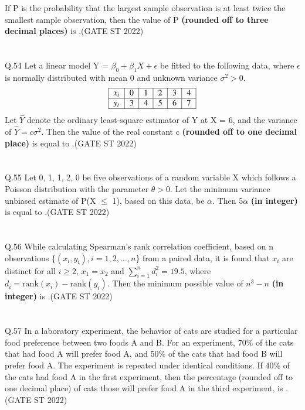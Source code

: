 \documentclass[journal,12pt,onecolumn]{IEEEtran}
\theoremstyle{remark}
\begin{document}
If P is the probability that the largest sample observation is at least twice the smallest sample observation, then the value of P \textbf{(rounded off to three decimal places)} is \underline{\hspace{2cm}}.\hfill (GATE ST 2022)\\
\\
\\
Q.54 Let a linear model Y = $\beta_0 + \beta_1X + \epsilon$ be fitted to the following data, where $\epsilon$ is normally distributed with mean 0 and unknown variance $\sigma^2 > 0$. 
\[
\begin{tabular}{|c|c|c|c|c|c|}
	\hline
	$x_i$ & 0 & 1 & 2 & 3 & 4 \\
	\hline
	$y_i$ & 3 & 4 & 5 & 6 & 7 \\
	\hline
\end{tabular}
\]
Let $\hat{Y}$ denote the ordinary least-square estimator of Y at X = 6, and the variance of $\hat{Y} = c\sigma^2$. Then the value of the real constant c \textbf{(rounded off to one decimal place)} is equal to \underline{\hspace{2cm}}.\hfill (GATE ST 2022)\\
\\
\\
Q.55 Let 0, 1, 1, 2, 0 be five observations of a random variable X which follows a Poisson distribution with the parameter $\theta > 0$. Let the minimum variance unbiased estimate of P(X $\leq$ 1), based on this data, be $\alpha$. Then 5$\alpha$ \textbf{(in integer)} is equal to \underline{\hspace{2cm}}.\hfill (GATE ST 2022)\\
\\
\\
Q.56 While calculating Spearman’s rank correlation coefficient, based on n observations $\{(x_i , y_i), i = 1, 2, \dots, n\}$ from a paired data, it is found that $x_i$ are distinct for all $i \ge 2$, $x_1 = x_2$ and $\sum_{i=1}^{n}d^2_i = 19.5$, where $d_i = \text{rank}(x_i) - \text{rank}(y_i)$. Then the minimum possible value of $n^3 - n$ \textbf{(in integer)} is \underline{\hspace{2cm}}.\hfill (GATE ST 2022)\\
\\
\\
Q.57 In a laboratory experiment, the behavior of cats are studied for a particular food preference between two foods A and B. For an experiment, 70\% of the cats that had food A will prefer food A, and 50\% of the cats that had food B will prefer food A. The experiment is repeated under identical conditions. If 40\% of the cats had food A in the first experiment, then the percentage (rounded off to one decimal place) of cats those will prefer food A in the third experiment, is \underline{\hspace{2cm}}.\hfill (GATE ST 2022)\\
\end{document}
